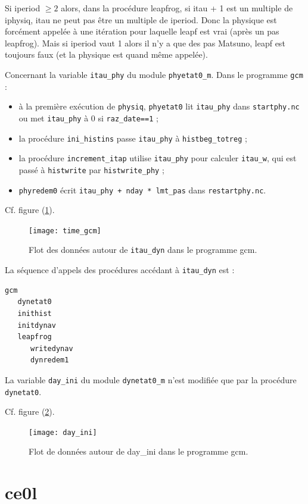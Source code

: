 \documentclass[a4paper,english,french]{article}
\begin{document}
Si iperiod $\ge 2$ alors, dans la procédure leapfrog, si itau + 1 est
un multiple de iphysiq, itau ne peut pas être un multiple de
iperiod. Donc la physique est forcément appelée à une itération pour
laquelle leapf est vrai (après un pas leapfrog). Mais si iperiod vaut
1 alors il n'y a que des pas Matsuno, leapf est toujours faux (et la
physique est quand même appelée).

Concernant la variable \verb+itau_phy+ du module
\verb+phyetat0_m+. Dans le programme \verb+gcm+ :
\begin{itemize}
\item à la première exécution de \verb+physiq+, \verb+phyetat0+ lit
  \verb+itau_phy+ dans \verb+startphy.nc+ ou met
  \verb+itau_phy+ à 0 si \verb+raz_date==1+ ;
\item la procédure \verb+ini_histins+ passe \verb+itau_phy+ à
  \verb+histbeg_totreg+ ;
\item la procédure \verb+increment_itap+ utilise \verb+itau_phy+ pour
  calculer \verb+itau_w+, qui est passé à \verb+histwrite+ par
  \verb+histwrite_phy+ ;
\item \verb+phyredem0+ écrit \verb|itau_phy + nday * lmt_pas| dans
  \verb+restartphy.nc+.
\end{itemize}

Cf. figure (\ref{fig:time_gcm}).
\begin{figure}
  \centering
  \texttt{[image: time\_gcm]}
  \caption[Flot de données : itau\_dyn]{Flot des données autour de
    \texttt{itau\_dyn} dans le programme gcm.}
  \label{fig:time_gcm}
\end{figure}
La séquence d'appels des procédures accédant à \verb+itau_dyn+ est :
\begin{verbatim}
gcm
   dynetat0
   inithist
   initdynav
   leapfrog
      writedynav
      dynredem1
\end{verbatim}

La variable \verb+day_ini+ du module \verb+dynetat0_m+ n'est modifiée
que par la procédure \verb+dynetat0+.

Cf. figure (\ref{fig:day_ini}).
\begin{figure}
  \centering
  \texttt{[image: day\_ini]}
  \caption{Flot de données autour de day\_ini dans le programme gcm.}
  \label{fig:day_ini}
\end{figure}

\section{ce0l}
\end{document}
